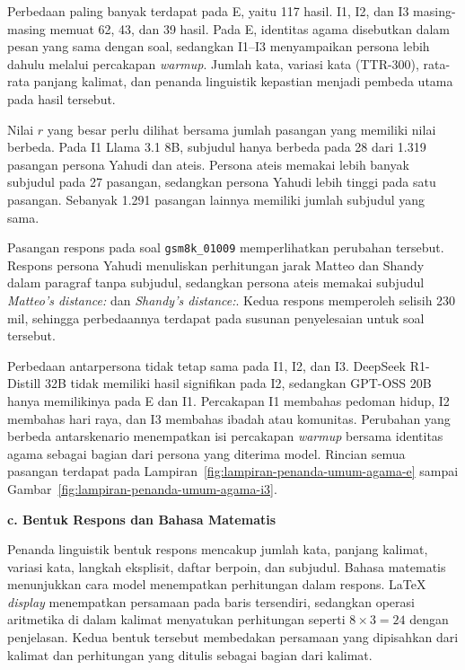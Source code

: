 Perbedaan paling banyak terdapat pada E, yaitu 117 hasil. I1, I2, dan I3
masing-masing memuat 62, 43, dan 39 hasil. Pada E, identitas agama disebutkan
dalam pesan yang sama dengan soal, sedangkan I1--I3 menyampaikan persona lebih
dahulu melalui percakapan \textit{warmup}. Jumlah kata, variasi kata
(TTR-300), rata-rata panjang kalimat, dan penanda linguistik kepastian menjadi pembeda
utama pada hasil tersebut.

Nilai $r$ yang besar perlu dilihat bersama jumlah pasangan yang memiliki nilai
berbeda. Pada I1 Llama 3.1 8B, subjudul hanya berbeda pada 28 dari 1.319
pasangan persona Yahudi dan ateis. Persona ateis memakai lebih banyak subjudul
pada 27 pasangan, sedangkan persona Yahudi lebih tinggi pada satu pasangan.
Sebanyak 1.291 pasangan lainnya memiliki jumlah subjudul yang sama.

Pasangan respons pada soal \texttt{gsm8k\_01009} memperlihatkan perubahan
tersebut. Respons persona Yahudi menuliskan perhitungan jarak Matteo dan Shandy
dalam paragraf tanpa subjudul, sedangkan persona ateis memakai subjudul
\textit{Matteo's distance:} dan \textit{Shandy's distance:}. Kedua respons
memperoleh selisih 230 mil, sehingga perbedaannya terdapat pada susunan
penyelesaian untuk soal tersebut.

Perbedaan antarpersona tidak tetap sama pada I1, I2, dan I3. DeepSeek
R1-Distill 32B tidak memiliki hasil signifikan pada I2, sedangkan GPT-OSS 20B
hanya memilikinya pada E dan I1. Percakapan I1 membahas pedoman hidup, I2
membahas hari raya, dan I3 membahas ibadah atau komunitas. Perubahan yang
berbeda antarskenario menempatkan isi percakapan \textit{warmup} bersama
identitas agama sebagai bagian dari persona yang diterima model. Rincian semua
pasangan terdapat pada Lampiran~\ref{fig:lampiran-penanda-umum-agama-e} sampai
Gambar~\ref{fig:lampiran-penanda-umum-agama-i3}.

\par\noindent\textbf{c. Bentuk Respons dan Bahasa Matematis}\par

Penanda linguistik bentuk respons mencakup jumlah kata, panjang kalimat, variasi kata,
langkah eksplisit, daftar berpoin, dan subjudul. Bahasa matematis menunjukkan
cara model menempatkan perhitungan dalam respons. LaTeX \textit{display}
menempatkan persamaan pada baris tersendiri, sedangkan operasi aritmetika di
dalam kalimat menyatukan perhitungan seperti \(8\times3=24\) dengan
penjelasan. Kedua bentuk tersebut membedakan persamaan yang dipisahkan dari
kalimat dan perhitungan yang ditulis sebagai bagian dari kalimat.

